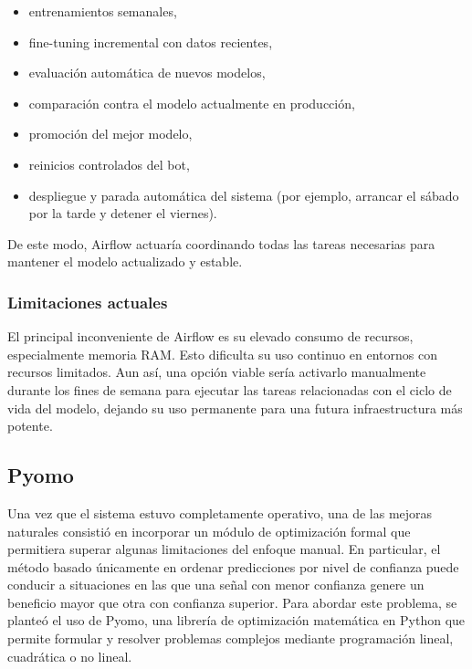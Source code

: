 \begin{itemize}
    \item entrenamientos semanales,
    \item fine-tuning incremental con datos recientes,
    \item evaluación automática de nuevos modelos,
    \item comparación contra el modelo actualmente en producción,
    \item promoción del mejor modelo,
    \item reinicios controlados del bot,
    \item despliegue y parada automática del sistema (por ejemplo, arrancar el sábado por la tarde y detener el viernes).
\end{itemize}

De este modo, Airflow actuaría coordinando todas las tareas necesarias para mantener el modelo actualizado y estable.

\subsubsection{Limitaciones actuales}

El principal inconveniente de Airflow es su elevado consumo de recursos, especialmente memoria RAM. Esto dificulta su uso continuo en entornos con
recursos limitados. Aun así, una opción viable sería activarlo manualmente durante los fines de semana para ejecutar las tareas relacionadas con el
ciclo de vida del modelo, dejando su uso permanente para una futura infraestructura más potente.



\subsection{Pyomo}

Una vez que el sistema estuvo completamente operativo, una de las mejoras naturales consistió en incorporar un módulo de optimización formal que
permitiera superar algunas limitaciones del enfoque manual. En particular, el método basado únicamente en ordenar predicciones por nivel de confianza
puede conducir a situaciones en las que una señal con menor confianza genere un beneficio mayor que otra con confianza superior. Para abordar este
problema, se planteó el uso de Pyomo, una librería de optimización matemática en Python que permite formular y resolver problemas complejos mediante
programación lineal, cuadrática o no lineal.

